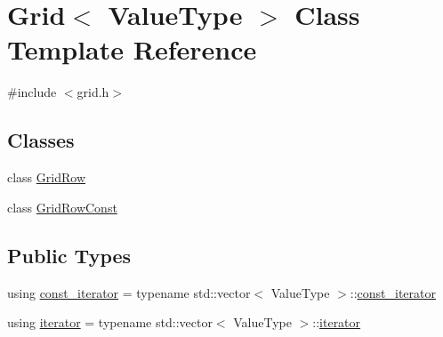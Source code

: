 \hypertarget{classGrid}{}\section{Grid$<$ Value\+Type $>$ Class Template Reference}
\label{classGrid}


{\ttfamily \#include $<$grid.\+h$>$}

\subsection*{Classes}
\begin{DoxyCompactItemize}
\item 
class \mbox{\hyperlink{classGrid_1_1GridRow}{Grid\+Row}}
\item 
class \mbox{\hyperlink{classGrid_1_1GridRowConst}{Grid\+Row\+Const}}
\end{DoxyCompactItemize}
\subsection*{Public Types}
\begin{DoxyCompactItemize}
\item 
using \mbox{\hyperlink{classGrid_aab30a5ff3fa2aff5b1f8b875438a3609}{const\+\_\+iterator}} = typename std\+::vector$<$ Value\+Type $>$\+::\mbox{\hyperlink{classGrid_aab30a5ff3fa2aff5b1f8b875438a3609}{const\+\_\+iterator}}
\item 
using \mbox{\hyperlink{classGrid_a438dbfd1a4dbef14e32131afd1bcb42f}{iterator}} = typename std\+::vector$<$ Value\+Type $>$\+::\mbox{\hyperlink{classGrid_a438dbfd1a4dbef14e32131afd1bcb42f}{iterator}}
\end{DoxyCompactItemize}
